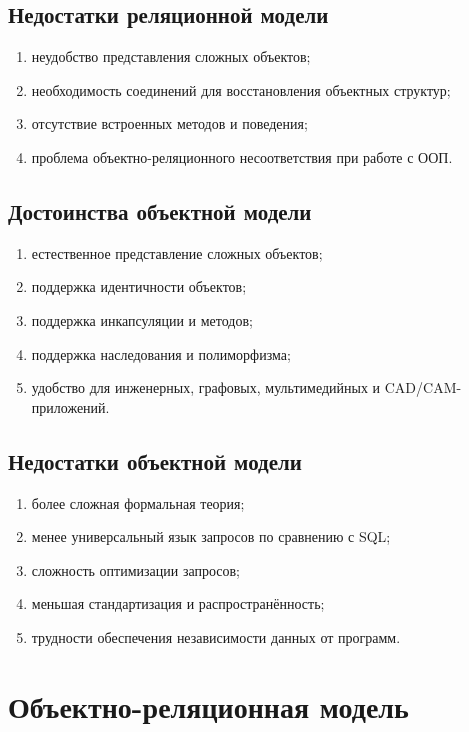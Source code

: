 \documentclass[12pt,a4paper]{article}
\theoremstyle{remark}
\begin{document}
\subsection{Недостатки реляционной модели}

\begin{enumerate}
    \item неудобство представления сложных объектов;
    \item необходимость соединений для восстановления объектных структур;
    \item отсутствие встроенных методов и поведения;
    \item проблема объектно-реляционного несоответствия при работе с ООП.
\end{enumerate}

\subsection{Достоинства объектной модели}

\begin{enumerate}
    \item естественное представление сложных объектов;
    \item поддержка идентичности объектов;
    \item поддержка инкапсуляции и методов;
    \item поддержка наследования и полиморфизма;
    \item удобство для инженерных, графовых, мультимедийных и CAD/CAM-приложений.
\end{enumerate}

\subsection{Недостатки объектной модели}

\begin{enumerate}
    \item более сложная формальная теория;
    \item менее универсальный язык запросов по сравнению с SQL;
    \item сложность оптимизации запросов;
    \item меньшая стандартизация и распространённость;
    \item трудности обеспечения независимости данных от программ.
\end{enumerate}

\section{Объектно-реляционная модель}
\end{document}
